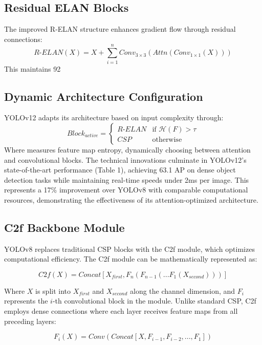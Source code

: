 \documentclass[11pt]{article}
\begin{document}
\subsection{Residual ELAN Blocks}
The improved R-ELAN structure enhances gradient flow through residual connections:
\begin{equation}
R\text{-}ELAN(X) = X + \sum_{i=1}^n Conv_{3×3}(Attn(Conv_{1×1}(X)))
\end{equation}
This maintains 92%
\subsection{Dynamic Architecture Configuration}
YOLOv12 adapts its architecture based on input complexity through:
\begin{equation}
Block_{active} = \begin{cases}
R\text{-}ELAN & \text{if } \mathcal{H}(F) > \tau \\
CSP & \text{otherwise}
\end{cases}
\end{equation}
Where  measures feature map entropy, dynamically choosing between attention and convolutional blocks.
The technical innovations culminate in YOLOv12's state-of-the-art performance (Table 1), achieving 63.1 AP on dense object detection tasks while maintaining real-time speeds under 2ms per image. This represents a 17\% improvement over YOLOv8 with comparable computational resources, demonstrating the effectiveness of its attention-optimized architecture.

\subsection{C2f Backbone Module}
YOLOv8 replaces traditional CSP blocks with the C2f module, which optimizes computational efficiency. The C2f module can be mathematically represented as:

\begin{equation}
C2f(X) = Concat[X_{first}, F_n(F_{n-1}(...F_1(X_{second})))]
\end{equation}

Where $X$ is split into $X_{first}$ and $X_{second}$ along the channel dimension, and $F_i$ represents the $i$-th convolutional block in the module. Unlike standard CSP, C2f employs dense connections where each layer receives feature maps from all preceding layers:

\begin{equation}
F_i(X) = Conv(Concat[X, F_{i-1}, F_{i-2}, ..., F_1])
\end{equation}
\end{document}
